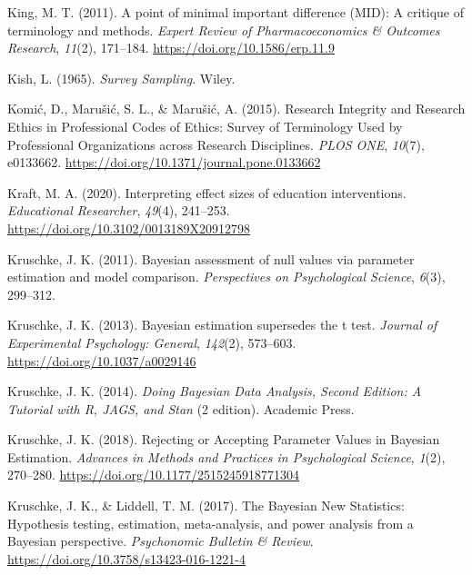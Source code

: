 \documentclass[
  letterpaper,
  DIV=11,
  numbers=noendperiod]{scrreprt}
\newlength{\cslhangindent}
\newlength{\cslentryspacingunit} %
\newenvironment{CSLReferences}[2] %
 {%
  \setlength{\parindent}{0pt}
  \ifodd #1
  \let\oldpar\par
  \def\par{\hangindent=\cslhangindent\oldpar}
  \fi
  \setlength{\parskip}{#2\cslentryspacingunit}
 }%
 {}
\begin{document}
\begin{CSLReferences}{1}{0}
\leavevmode{}%
King, M. T. (2011). A point of minimal important difference ({MID}): A
critique of terminology and methods. \emph{Expert Review of
Pharmacoeconomics \& Outcomes Research}, \emph{11}(2), 171--184.
\url{https://doi.org/10.1586/erp.11.9}

\leavevmode{}%
Kish, L. (1965). \emph{Survey {Sampling}}. {Wiley}.

\leavevmode{}%
Komić, D., Marušić, S. L., \& Marušić, A. (2015). Research {Integrity}
and {Research Ethics} in {Professional Codes} of {Ethics}: {Survey} of
{Terminology Used} by {Professional Organizations} across {Research
Disciplines}. \emph{PLOS ONE}, \emph{10}(7), e0133662.
\url{https://doi.org/10.1371/journal.pone.0133662}

\leavevmode{}%
Kraft, M. A. (2020). Interpreting effect sizes of education
interventions. \emph{Educational Researcher}, \emph{49}(4), 241--253.
\url{https://doi.org/10.3102/0013189X20912798}

\leavevmode{}%
Kruschke, J. K. (2011). Bayesian assessment of null values via parameter
estimation and model comparison. \emph{Perspectives on Psychological
Science}, \emph{6}(3), 299--312.

\leavevmode{}%
Kruschke, J. K. (2013). Bayesian estimation supersedes the t test.
\emph{Journal of Experimental Psychology: General}, \emph{142}(2),
573--603. \url{https://doi.org/10.1037/a0029146}

\leavevmode{}%
Kruschke, J. K. (2014). \emph{Doing {Bayesian Data Analysis}, {Second
Edition}: {A Tutorial} with {R}, {JAGS}, and {Stan}} (2 edition).
{Academic Press}.

\leavevmode{}%
Kruschke, J. K. (2018). Rejecting or {Accepting Parameter Values} in
{Bayesian Estimation}. \emph{Advances in Methods and Practices in
Psychological Science}, \emph{1}(2), 270--280.
\url{https://doi.org/10.1177/2515245918771304}

\leavevmode{}%
Kruschke, J. K., \& Liddell, T. M. (2017). The {Bayesian New
Statistics}: {Hypothesis} testing, estimation, meta-analysis, and power
analysis from a {Bayesian} perspective. \emph{Psychonomic Bulletin \&
Review}. \url{https://doi.org/10.3758/s13423-016-1221-4}


\end{CSLReferences}
\end{document}

